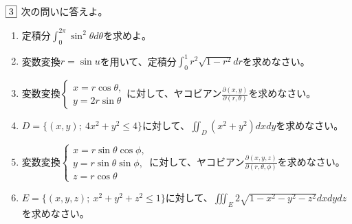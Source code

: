 \begin{tcolorbox} %
	$\fbox{3}$ 次の問いに答えよ。
\begin{enumerate}
	\item 定積分$\int_0^{2\pi} \sin^2{\theta}d\theta$を求めよ。
	\item 変数変換$r= \sin{u}$を用いて、定積分$\int_0^1 r^2\sqrt{1- r^2}dr$を求めなさい。
	\item 変数変換$\begin{cases}x= r\cos{\theta},\\ y= 2r\sin{\theta}\end{cases}$に対して、ヤコビアン$\frac{\partial(x, y)}{\partial(r, \theta)}$を求めなさい。
	\item $D= \{(x, y);\ 4x^2+ y^2\le 4\}$に対して、$\iint_D (x^2+ y^2)dxdy$を求めなさい。
	\item 変数変換$\begin{cases}x= r\sin{\theta}\cos{\phi},\\ y= r\sin{\theta}\sin{\phi},\\ z= r\cos{\theta} \end{cases}$に対して、ヤコビアン$\frac{\partial(x, y, z)}{\partial(r, \theta, \phi)}$を求めなさい。
	\item $E= \{(x, y, z);\ x^2+ y^2+ z^2\le 1\}$に対して、$\iiint_E 2\sqrt{1- x^2- y^2- z^2}dxdydz$を求めなさい。
\end{enumerate}
\end{tcolorbox}

